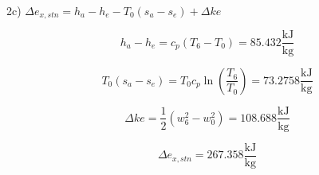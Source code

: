 2c) \(\Delta e_{x,stn} = h_a - h_e - T_0 (s_a - s_e) + \Delta ke\)

\[ h_a - h_e = c_p \left( T_6 - T_0 \right) = 85.432 \frac{\text{kJ}}{\text{kg}} \]

\[ T_0 (s_a - s_e) = T_0 c_p \ln \left( \frac{T_6}{T_0} \right) = 73.2758 \frac{\text{kJ}}{\text{kg}} \]

\[ \Delta ke = \frac{1}{2} \left( w_6^2 - w_0^2 \right) = 108.688 \frac{\text{kJ}}{\text{kg}} \]

\[ \Delta e_{x,stn} = 267.358 \frac{\text{kJ}}{\text{kg}} \]